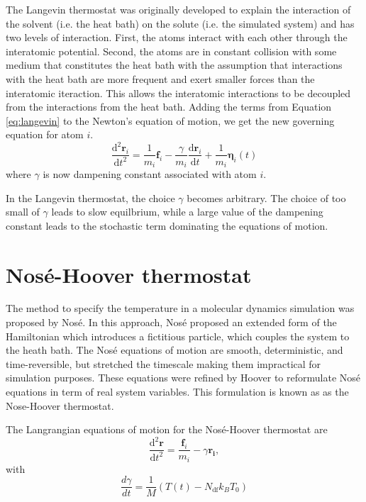 The Langevin thermostat\cite{grest1986_langevin} was originally developed to explain the interaction of the solvent (i.e. the heat bath) on the solute (i.e. the simulated system) and has two levels of interaction.  First, the atoms interact with each other through the interatomic potential.  Second, the atoms are in constant collision with some medium that constitutes the heat bath with the assumption that interactions with the heat bath are more frequent and exert smaller forces than the interatomic iteraction.  This allows the  interatomic interactions to be decoupled from the interactions from the heat bath.  Adding the terms from Equation \ref{eq:langevin} to the Newton's equation of motion, we get the new governing equation for atom $i$.
\begin{equation}
  \label{eq:langevin_eos}
  \frac{\mathrm{d}^2 \bm{r}_i}
	     {\mathrm{d} t^2}
  =
  \frac{1}{m_i} \bm{f}_i
  - \frac{\gamma}
	       {m_i}
	  \frac{\mathrm{d} \bm{r}_i}
		     {\mathrm{d} t}
  + \frac{1}{m_i} \bm{\eta}_i(t)
\end{equation}
where $\gamma$ is now dampening constant associated with atom $i$.

In the Langevin thermostat, the choice $\gamma$ becomes arbitrary.  The choice of too small of $\gamma$ leads to slow equilbrium, while a large value of the dampening constant leads to the stochastic term dominating the equations of motion.

\section{Nos\'e-Hoover thermostat}
The method to specify the temperature in a molecular dynamics simulation was proposed by Nos\'e\cite{nose1984_npt_1,nose1984_npt_2}.  In this approach, Nos\'e proposed an extended form of the Hamiltonian which introduces a fictitious particle, which couples the system to the heath bath.  The Nos\'e equations of motion are smooth, deterministic, and time-reversible, but stretched the timescale making them impractical for simulation purposes.  These equations were refined by Hoover\cite{hoover1985_npt} to reformulate Nos\'e equations in term of real system variables.  This formulation is known as as the Nose-Hoover thermostat.

The Langrangian equations of motion for the Nos\'e-Hoover thermostat are
\begin{equation}
  \label{eq:nose_hoover_1}
  \frac{\mathrm{d}^2 \bm{r} }
       {\mathrm{d} t^2 }
  =
  \frac{\bm{f}_i}
	     {m_i}
	- \gamma \bm{r_i},
\end{equation}
with
\begin{equation}
  \label{eq:nose_hoover_2}
  \frac{d\gamma}{dt}
  =
  \frac{1}{M}
   \left(
       T(t) - N_{\mathrm{df}} k_B T_0
   \right)
\end{equation}

